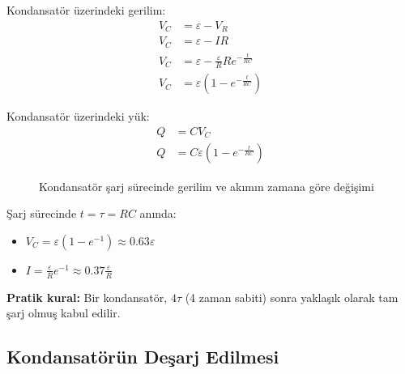\documentclass[11pt,letterpaper,twocolumn]{fenbil}
\begin{document}
Kondansatör üzerindeki gerilim:
\begin{align}
V_C &= \varepsilon - V_R\\
V_C &= \varepsilon - IR\\
V_C &= \varepsilon - \frac{\varepsilon}{R}Re^{-\frac{t}{RC}}\\
V_C &= \varepsilon(1 - e^{-\frac{t}{RC}})
\end{align}

Kondansatör üzerindeki yük:
\begin{align}
Q &= CV_C\\
Q &= C\varepsilon(1 - e^{-\frac{t}{RC}})
\end{align}

\begin{figure}[h]
\centering
{}
\caption{Kondansatör şarj sürecinde gerilim ve akımın zamana göre değişimi}
\end{figure}

\begin{tcolorbox}[title=SINAV İÇİN]
Şarj sürecinde $t = \tau = RC$ anında:
\begin{itemize}
\item $V_C = \varepsilon(1-e^{-1}) \approx 0.63\varepsilon$
\item $I = \frac{\varepsilon}{R}e^{-1} \approx 0.37\frac{\varepsilon}{R}$
\end{itemize}
\textbf{Pratik kural:} Bir kondansatör, $4\tau$ (4 zaman sabiti) sonra yaklaşık olarak tam şarj olmuş kabul edilir.
\end{tcolorbox}

\subsection{Kondansatörün Deşarj Edilmesi}
\end{document}
